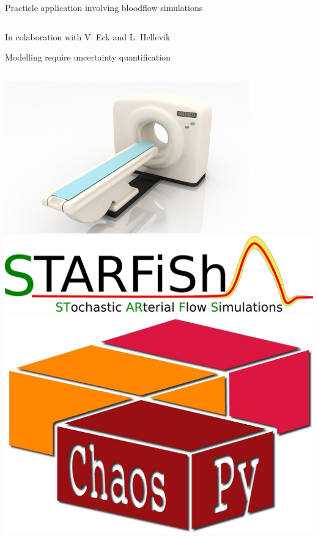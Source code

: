 \documentclass{beamer}
\begin{document}
\begin{frame}[fragile]{Practicle application involving bloodflow
    simulations}{}
\begin{columns}
\begin{center}
        \end{center}
    \end{columns}
    \small
    \begin{flushright}
        In colaboration with V. Eck and L. Hellevik
    \end{flushright}
\end{frame}

\begin{frame}{Modelling require uncertainty quantification}{}
    \begin{columns}
        \includegraphics[width=\textwidth]{ntnu/ID-10015904.jpg}
        \includegraphics[width=\textwidth]{ntnu/STARFiSh-Logo_small_transparent.png}
        \includegraphics[width=\textwidth]{chaospy_logo.jpg}

\end{columns}
\end{frame}
\end{document}
